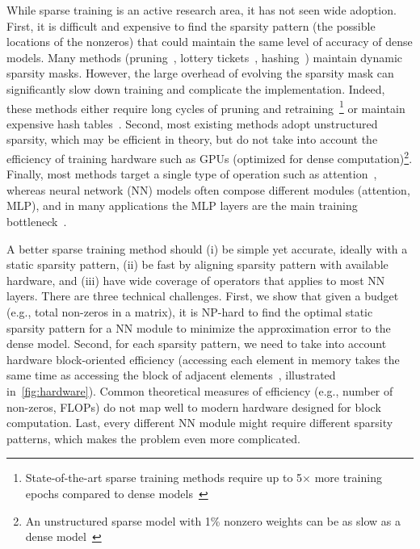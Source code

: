 While sparse training is an active research area, it has not seen wide adoption. First, it is difficult and expensive to find the sparsity pattern (the possible locations of the nonzeros) that could maintain the same level of accuracy of dense models. Many methods (pruning~\citep{lee2018snip}, lottery tickets~\citep{frankle2018lottery}, hashing~\citep{kitaev2020reformer}) maintain dynamic sparsity masks. However, the large overhead of evolving the sparsity mask can significantly slow down training and complicate the implementation. Indeed, these methods either require long cycles of pruning and retraining~\citep{frankle2018lottery}\footnote{State-of-the-art sparse training methods require up to 5$\times$ more training epochs compared to dense models~\citep{evci2020rigging}} or maintain expensive hash tables~\citep{chen2019slide}. Second, most existing methods adopt unstructured sparsity, which may be efficient in theory, but do not take into account the efficiency of training hardware such as GPUs (optimized for dense computation)\footnote{An unstructured sparse model with 1\% nonzero weights can be as slow as a dense model~\citep{hooker2020hardware}}. Finally, most methods target a single type of operation such as attention~\citep{child2019generating,zaheer2020bigbird}, whereas neural network (NN) models often compose different modules (attention, MLP), and in many applications the MLP layers are the main training bottleneck~\citep{wu2020lite}.

A better sparse training method should (i) be simple yet accurate, ideally with a static sparsity pattern, (ii) be fast by aligning sparsity pattern with available hardware, and (iii) have wide coverage of operators that applies to most NN layers. There are three technical challenges. First, we show that given a budget (e.g., total non-zeros in a matrix), it is NP-hard to find the optimal static sparsity pattern for a NN module to minimize the approximation error to the dense model. Second, for each sparsity pattern, we need to take into account hardware block-oriented efficiency (accessing each element in memory takes the same time as accessing the block of adjacent elements~\citep{cook2012cuda}, illustrated in~\ref{fig:hardware}). Common theoretical measures of efficiency (e.g., number of non-zeros, FLOPs) do not map well to modern hardware designed for block computation. Last, every different NN module might require different sparsity patterns, which makes the problem even more complicated.

